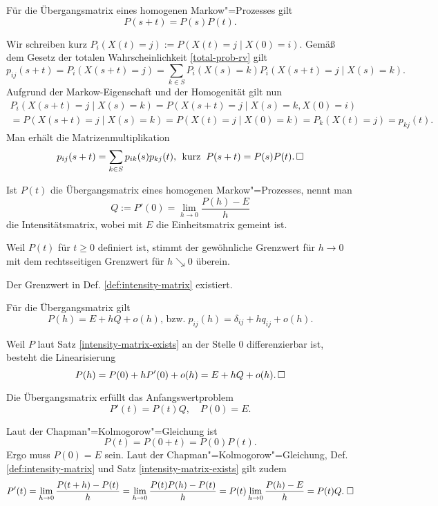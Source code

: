 \begin{Satz}%
\newlinefirst
Für die Übergangsmatrix eines homogenen Markow"=Prozesses gilt
\[P(s+t) = P(s)P(t).\]
\end{Satz}

\begin{Beweis}
Wir schreiben kurz $P_i(X(t)=j):=P(X(t)=j\mid X(0)=i)$. Gemäß dem
Gesetz der totalen Wahrscheinlichkeit \ref{total-prob-rv} gilt
\[p_{ij}(s+t) = P_i(X(s+t)=j)
= \sum_{k\in S} P_i(X(s)=k) P_i(X(s+t)=j\mid X(s)=k).\]
Aufgrund der Markow-Eigenschaft und der Homogenität gilt nun
\begin{gather*}
P_i(X(s+t)=j\mid X(s)=k) = P(X(s+t)=j\mid X(s)=k, X(0)=i)\\
= P(X(s+t)=j\mid X(s)=k) = P(X(t)=j\mid X(0)=k) = P_k(X(t)=j) = p_{kj}(t).
\end{gather*}
Man erhält die Matrizenmultiplikation
\[p_{ij}(s+t) = \sum_{k\in S} p_{ik}(s) p_{kj}(t),\;\,
\text{kurz}\;\; P(s+t)=P(s)P(t).\,\square\]
\end{Beweis}

\begin{Definition}[Intensitätsmatrix]%
\label{def:intensity-matrix}\newlinefirst
Ist $P(t)$ die Übergangsmatrix eines homogenen Markow"=Prozesses, nennt man
\[Q := P'(0) = \lim_{h\to 0}\frac{P(h)-E}{h}\]
die Intensitätsmatrix, wobei mit $E$ die Einheitsmatrix gemeint ist.
\end{Definition}
 Weil $P(t)$ für $t\ge 0$ definiert ist, stimmt der
gewöhnliche Grenzwert für $h\to 0$ mit dem rechtsseitigen Grenzwert
für $h\searrow 0$ überein.

\begin{Satz}\label{intensity-matrix-exists}
Der Grenzwert in Def. \ref{def:intensity-matrix} existiert.
\end{Satz}

\begin{Satz}
Für die Übergangsmatrix gilt
\[P(h) = E + hQ + o(h),\,\text{bzw.}\; p_{ij}(h) = \delta_{ij} + hq_{ij} + o(h).\]
\end{Satz}
\begin{Beweis}
Weil $P$ laut Satz \ref{intensity-matrix-exists} an der Stelle $0$
differenzierbar ist, besteht die Linearisierung
\[P(h) = P(0) + hP'(0) + o(h) = E + hQ + o(h).\,\square\]
\end{Beweis}

\begin{Satz}\newlinefirst
Die Übergangsmatrix erfüllt das Anfangswertproblem
\[P'(t)=P(t)Q,\quad P(0)=E.\]
\end{Satz}
\begin{Beweis}
Laut der Chapman"=Kolmogorow"=Gleichung ist
\[P(t) = P(0+t) = P(0)P(t).\]
Ergo muss $P(0)=E$ sein. Laut der Chapman"=Kolmogorow"=Gleichung,
Def. \ref{def:intensity-matrix} und Satz \ref{intensity-matrix-exists}
gilt zudem
\[P'(t) = \lim_{h\to 0}\frac{P(t+h)-P(t)}{h}
= \lim_{h\to 0}\frac{P(t)P(h)-P(t)}{h}
= P(t)\lim_{h\to 0}\frac{P(h)-E}{h} = P(t)Q.\;\square\]
\end{Beweis}

